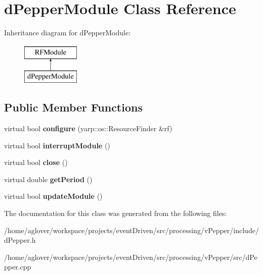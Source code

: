 \hypertarget{classdPepperModule}{\section{d\-Pepper\-Module Class Reference}
\label{classdPepperModule}
}
Inheritance diagram for d\-Pepper\-Module\-:\begin{figure}[H]
\begin{center}
\leavevmode
\includegraphics[height=2.000000cm]{classdPepperModule}
\end{center}
\end{figure}
\subsection*{Public Member Functions}
\begin{DoxyCompactItemize}
\item 
\hypertarget{classdPepperModule_a11343b0bb91bfbc6e4f0f7252ec735e0}{virtual bool {\bfseries configure} (yarp\-::os\-::\-Resource\-Finder \&rf)}\label{classdPepperModule_a11343b0bb91bfbc6e4f0f7252ec735e0}

\item 
\hypertarget{classdPepperModule_a7db49020f01515fbf8b3b8e43637f5d0}{virtual bool {\bfseries interrupt\-Module} ()}\label{classdPepperModule_a7db49020f01515fbf8b3b8e43637f5d0}

\item 
\hypertarget{classdPepperModule_a0f53fec8e6d6c2b6619d874bf21d25a9}{virtual bool {\bfseries close} ()}\label{classdPepperModule_a0f53fec8e6d6c2b6619d874bf21d25a9}

\item 
\hypertarget{classdPepperModule_a893991e035a6f52815d3fa73425a5532}{virtual double {\bfseries get\-Period} ()}\label{classdPepperModule_a893991e035a6f52815d3fa73425a5532}

\item 
\hypertarget{classdPepperModule_accac55827cea616f7d27102491f58f8e}{virtual bool {\bfseries update\-Module} ()}\label{classdPepperModule_accac55827cea616f7d27102491f58f8e}

\end{DoxyCompactItemize}


The documentation for this class was generated from the following files\-:\begin{DoxyCompactItemize}
\item 
/home/aglover/workspace/projects/event\-Driven/src/processing/v\-Pepper/include/d\-Pepper.\-h\item 
/home/aglover/workspace/projects/event\-Driven/src/processing/v\-Pepper/src/d\-Pepper.\-cpp\end{DoxyCompactItemize}
